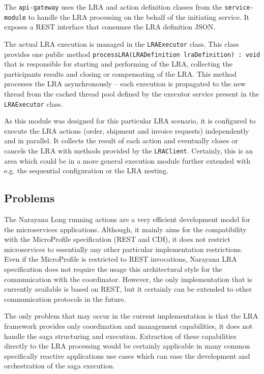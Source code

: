 \documentclass[oneside,
  digital, %
  table,   %
  nolof,     %
  nolot,     %
]{fithesis3}
\begin{document}
The \texttt{api-gateway} uses the LRA and action definition classes from the \texttt{service-module} to handle the LRA processing on the behalf of the initiating service. It exposes a REST interface that consumes the LRA definition JSON.

The actual LRA execution is managed in the \texttt{LRAExecutor} class. This class provides one public method \texttt{processLRA(LRADefinition lraDefinition) : void} that is responsible for starting and performing of the LRA, collecting the participants results and closing or compensating of the LRA. This method processes the LRA asynchronously -- each execution is propagated to the new thread from the cached thread pool defined by the executor service present in the \texttt{LRAExecutor} class.

As this module was designed for this particular LRA scenario, it is configured to execute the LRA actions (order, shipment and invoice requests) independently and in parallel. It collects the result of each action and eventually closes or cancels the LRA with methods provided by the \texttt{LRAClient}. Certainly, this is an area which could be in a more general execution module further extended with e.g. the sequential configuration or the LRA nesting.

\subsection{Problems}

The Narayana Long running actions are a very efficient development model for the microservices applications. Although, it mainly aims for the compatibility with the MicroProfile specification (REST and CDI), it does not restrict microservices to essentially any other particular implementation restrictions. Even if the MicroProfile is restricted to REST invocations, Narayana LRA specification does not require the usage this architectural style for the communication with the coordinator. However, the only implementation that is currently available is based on REST, but it certainly can be extended to other communication protocols in the future.

The only problem that may occur in the current implementation is that the LRA framework provides only coordination and management capabilities, it does not handle the saga structuring and execution. Extraction of these capabilities directly to the LRA processing would be certainly applicable in many common specifically reactive applications use cases which can ease the development and orchestration of the saga execution. 
\end{document}
